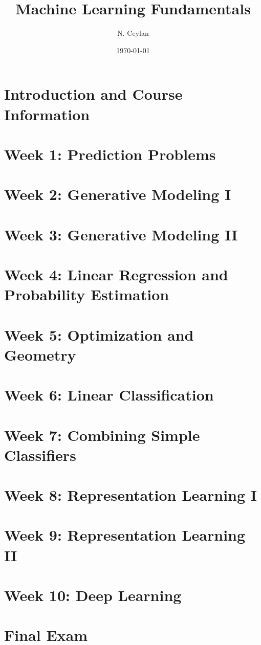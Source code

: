 \documentclass[letterpaper,12pt]{article}
\begin{document}
\title{Machine Learning Fundamentals}
\author{N. Ceylan}
\date{\today}
\maketitle






\section{Introduction and Course Information
}


\section{Week 1: Prediction Problems
}
\section{Week 2: Generative Modeling I
}


\section{Week 3: Generative Modeling II
}


\section{Week 4: Linear Regression and Probability Estimation
}
\section{Week 5: Optimization and Geometry
}

\section{Week 6: Linear Classification
}

\section{Week 7: Combining Simple Classifiers
}

\section{Week 8: Representation Learning I
}

\section{Week 9: Representation Learning II
}

\section{Week 10: Deep Learning
}
\section{Final Exam
}
\end{document}
